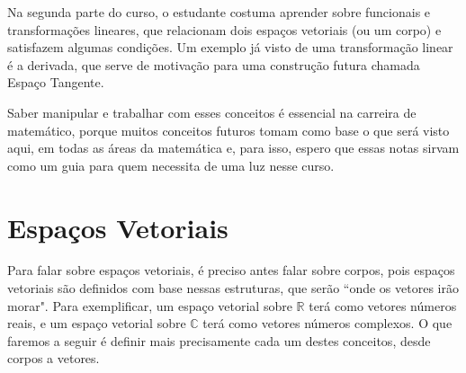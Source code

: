 \documentclass{article}
\begin{document}
Na segunda parte do curso, o estudante costuma aprender sobre funcionais e transforma\c c\~oes
lineares, que relacionam dois espa\c cos vetoriais (ou um corpo) e satisfazem algumas condi\c c\~oes.
Um exemplo j\'a visto de uma transforma\c c\~ao linear \'e a derivada, que serve de motiva\c c\~ao
para uma constru\c c\~ao futura chamada Espa\c co Tangente.

Saber manipular e trabalhar com esses conceitos \'e essencial na carreira de matem\'atico, porque
muitos conceitos futuros tomam como base o que ser\'a visto aqui, em todas as \'areas da matem\'atica e,
para isso, espero que essas notas sirvam como um guia para quem necessita de uma luz nesse curso.


\section{Espa\c cos Vetoriais}
Para falar sobre espa\c cos vetoriais, \'e preciso antes falar sobre corpos, pois espa\c cos
vetoriais s\~ao definidos com base nessas estruturas, que ser\~ao ``onde os vetores ir\~ao morar".
Para exemplificar, um espa\c co vetorial sobre $\mathbb{R}$ ter\'a como vetores n\'umeros reais,
e um espa\c co vetorial sobre $\mathbb{C}$ ter\'a como vetores n\'umeros complexos. O que
faremos a seguir \'e definir mais precisamente cada um destes conceitos, desde corpos a vetores.
\end{document}
